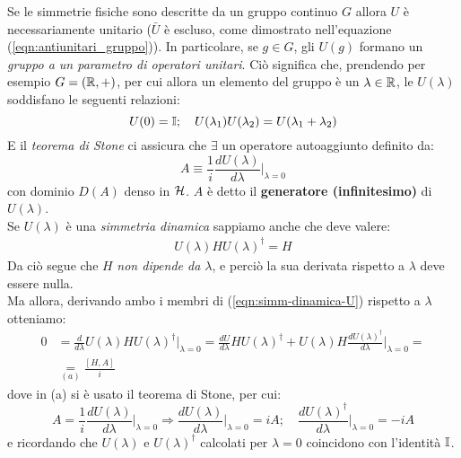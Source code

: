 \documentclass[../../FisicaTeorica.tex]{subfiles}
\begin{document}
Se le simmetrie fisiche sono descritte da un gruppo continuo $G$ allora $U$ è necessariamente unitario ($\bar{U}$ è escluso, come dimostrato nell'equazione (\ref{eqn:antiunitari_gruppo})). In particolare, se $g\in G$, gli $U(g)$ formano un \textit{gruppo a un parametro di operatori unitari}. Ciò significa che, prendendo per esempio $G=(\mathbb{R},+)$, per cui allora un elemento del gruppo è un $\lambda \in \mathbb{R}$, le $U(\lambda)$ soddisfano le seguenti relazioni:
\[
U(0)=\mathbb{I}; \quad U(\lambda_1)U(\lambda_2)=U(\lambda_1+\lambda_2)
\]
E il \textit{teorema di Stone} ci assicura che $\exists$ un operatore autoaggiunto definito da:
\begin{equation}
A\equiv \frac{1}{i}\frac{dU(\lambda)}{d\lambda}\Big|_{\lambda=0}
\label{eqn:teorema_stone_enunciato}
\end{equation}
con dominio $D(A)$ denso in $\mathcal{H}$. $A$ è detto il \textbf{generatore (infinitesimo)} di $U(\lambda)$.\\

Se $U(\lambda)$ è una \textit{simmetria dinamica} sappiamo anche che deve valere:
\begin{align}
U(\lambda)H U(\lambda)^\dag = H
\label{eqn:simm-dinamica-U}
\end{align}
Da ciò segue che $H$ \textit{non dipende da $\lambda$}, e perciò la sua derivata rispetto a $\lambda$ deve essere nulla.\\ Ma allora, derivando ambo i membri di (\ref{eqn:simm-dinamica-U}) rispetto a $\lambda$ otteniamo:
\begin{align}\nonumber
0 &= \frac{d}{d\lambda} U(\lambda) HU(\lambda)^\dag \Big|_{\lambda=0} = \frac{dU}{d\lambda}H U(\lambda)^\dag + U(\lambda)H\frac{dU(\lambda)^\dag}{d\lambda} \Big|_{\lambda=0} =\\
&\underset{(a)}{=} 
\frac{[H,A]}{i}
\label{eqn:commutazione_evoluzione}
\end{align}
dove in (a) si è usato il teorema di Stone, per cui:
\[
A = \frac{1}{i}\frac{dU(\lambda)}{d\lambda}\Big|_{\lambda=0}\Rightarrow
\frac{dU(\lambda)}{d\lambda}\Big|_{\lambda=0}=iA; \quad \frac{dU(\lambda)^\dag}{d\lambda}\Big|_{\lambda=0} = -iA
\]
e ricordando che $U(\lambda)$ e $U(\lambda)^\dag$ calcolati per $\lambda=0$ coincidono con l'identità $\mathbb{I}$.\\
\end{document}
